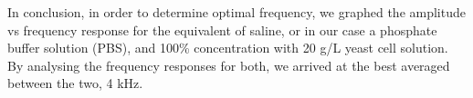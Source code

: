 In conclusion, in order to determine optimal frequency, we graphed the amplitude vs frequency response for the equivalent of saline, or in our case a phosphate buffer solution (PBS), and 100\% concentration with 20 g/L yeast cell solution.
By analysing the frequency responses for both, we arrived at the best averaged between the two, 4 kHz.

